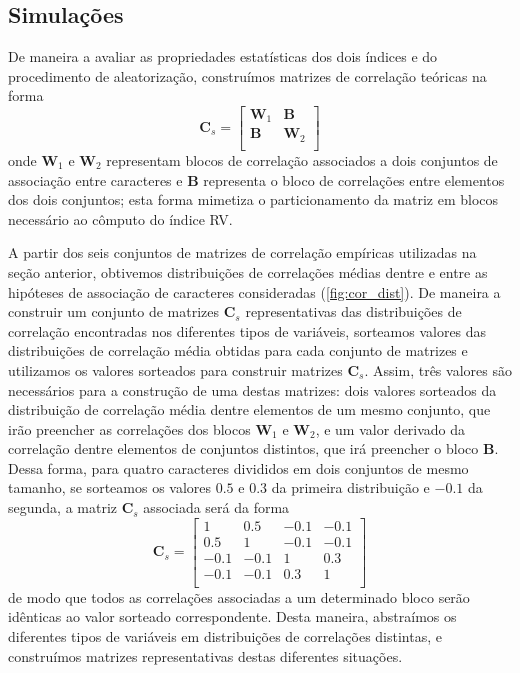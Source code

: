 \documentclass[11pt,]{article}
\begin{document}
\subsection{Simulações}\label{simulacoes}

De maneira a avaliar as propriedades estatísticas dos dois índices e do
procedimento de aleatorização, construímos matrizes de correlação
teóricas na forma \[
\mathbf{C}_{s} =
\begin{bmatrix}
\mathbf{W}_1 & \mathbf{B} \\
\mathbf{B} & \mathbf{W}_2 \\
\end{bmatrix}
\] onde $\mathbf{W}_1$ e $\mathbf{W}_2$ representam blocos de correlação
associados a dois conjuntos de associação entre caracteres e
$\mathbf{B}$ representa o bloco de correlações entre elementos dos dois
conjuntos; esta forma mimetiza o particionamento da matriz em blocos
necessário ao cômputo do índice RV.

A partir dos seis conjuntos de matrizes de correlação empíricas
utilizadas na seção anterior, obtivemos distribuições de correlações
médias dentre e entre as hipóteses de associação de caracteres
consideradas (\autoref{fig:cor_dist}). De maneira a construir um
conjunto de matrizes $\mathbf{C}_{s}$ representativas das distribuições
de correlação encontradas nos diferentes tipos de variáveis, sorteamos
valores das distribuições de correlação média obtidas para cada conjunto
de matrizes e utilizamos os valores sorteados para construir matrizes
$\mathbf{C}_{s}$. Assim, três valores são necessários para a construção
de uma destas matrizes: dois valores sorteados da distribuição de
correlação média dentre elementos de um mesmo conjunto, que irão
preencher as correlações dos blocos $\mathbf{W}_1$ e $\mathbf{W}_2$, e
um valor derivado da correlação dentre elementos de conjuntos distintos,
que irá preencher o bloco $\mathbf{B}$. Dessa forma, para quatro
caracteres divididos em dois conjuntos de mesmo tamanho, se sorteamos os
valores $0.5$ e $0.3$ da primeira distribuição e $-0.1$ da segunda, a
matriz $\mathbf{C}_{s}$ associada será da forma \[
\mathbf{C}_s =
\begin{bmatrix}
1 & 0.5 & -0.1 & -0.1 \\
0.5 & 1 & -0.1 & -0.1 \\
-0.1 & -0.1 & 1 & 0.3 \\
-0.1 & -0.1 & 0.3 & 1 \\
\end{bmatrix}
\] de modo que todos as correlações associadas a um determinado bloco
serão idênticas ao valor sorteado correspondente. Desta maneira,
abstraímos os diferentes tipos de variáveis em distribuições de
correlações distintas, e construímos matrizes representativas destas
diferentes situações.
\end{document}
